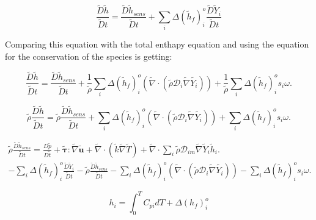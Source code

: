 \documentclass[preprint,12pt,authoryear]{elsarticle}
\begin{document}
\begin{equation}
	\frac{\tilde{D} \tilde{h}}{\tilde{D} t}
	=
	\frac{\tilde{D}\tilde{h}_{sens}}{\tilde{D}t}
	+
	\sum_i\Delta(\tilde{h}_f)_i^o
	\frac{\tilde{D}\tilde{Y}_i}{\tilde{D}t}
\end{equation}

Comparing this equation with the total enthapy equation and 
using the equation for the conservation of the species is 
getting:

\begin{equation}
	\frac{\tilde{D} \tilde{h}}{\tilde{D} t}
	=
	\frac{\tilde{D}\tilde{h}_{sens}}{\tilde{D}t}
	+
	\frac{1}{\tilde{\rho}}
	\sum_i\Delta(\tilde{h}_f)_i^o
	\left(
	\tilde{\nabla}\cdot( \tilde{\rho} \mathcal{D}_i\tilde{\nabla} \tilde{Y_i})
	\right)
	+
	\frac{1}{\tilde{\rho}}
	\sum_i\Delta(\tilde{h}_f)_i^o
	s_i \omega.
\end{equation}

\begin{equation}
	\tilde{\rho}
	\frac{\tilde{D} \tilde{h}}{\tilde{D} t}
	=
	\tilde{\rho}
	\frac{\tilde{D}\tilde{h}_{sens}}{\tilde{D}t}
	+
	\sum_i\Delta(\tilde{h}_f)_i^o
	\left(
	\tilde{\nabla}\cdot( \tilde{\rho} \mathcal{D}_i\tilde{\nabla} \tilde{Y_i})
	\right)
	+
	\sum_i\Delta(\tilde{h}_f)_i^o
	s_i \omega.
\end{equation}

\begin{equation}
\begin{split}
	\tilde{\rho}
	\frac{\tilde{D}\tilde{h}_{sens}}{\tilde{D}t}
=
        \frac{D \tilde{p}}{D\tilde{t}}
+       
        \pmb{\tilde{\tau}}:\tilde{\nabla} \tilde{\mathbf{u}} 
+ 
        \tilde{\nabla} \cdot (\tilde{k}\tilde{\nabla} \tilde{T})
+
        \tilde{\nabla} \cdot
        \sum\limits_i 
        \tilde{\rho}\mathcal{D}_{im}\tilde{\nabla}\tilde{Y}_i     
        \tilde{h}_i.
	\\
-
    	\sum_i\Delta(\tilde{h}_f)_i^o
        \frac{\tilde{D}\tilde{Y}_i}{\tilde{D}t}
-
	\tilde{\rho}
	\frac{\tilde{D}\tilde{h}_{sens}}{\tilde{D}t}
-
	\sum_i\Delta(\tilde{h}_f)_i^o
	\left(
	\tilde{\nabla}\cdot( \tilde{\rho} \mathcal{D}_i\tilde{\nabla} \tilde{Y_i})
	\right)
-
	\sum_i\Delta(\tilde{h}_f)_i^o
	s_i \omega.
\end{split}
\end{equation}


\begin{equation}
	h_i=\int_0^TC_{pi}dT+\Delta(h_f)_i^o
\end{equation}
\end{document}
